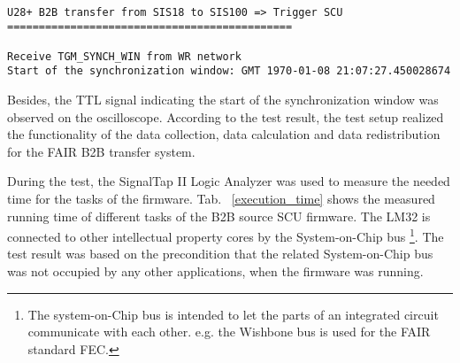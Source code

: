 \begin{lstlisting}[language={[ANSI]C}, keywordstyle=\color{blue!70}, commentstyle=\color{red!50!green!50!blue!50}, frame=shadowbox, rulesepcolor=\color{red!20!green!20!blue!20}]

U28+ B2B transfer from SIS18 to SIS100 => Trigger SCU
=============================================

Receive TGM_SYNCH_WIN from WR network
Start of the synchronization window: GMT 1970-01-08 21:07:27.450028674
\end{lstlisting}

Besides, the TTL signal indicating the start of the synchronization window was observed on the oscilloscope. According to the test result, the test setup realized the functionality of the data collection, data calculation and data redistribution for the FAIR B2B transfer system.


During the test, the SignalTap II Logic Analyzer was used to measure the needed time for the tasks of the firmware. Tab. ~\ref{execution_time} shows the measured running time of different tasks of the B2B source SCU firmware. The LM32 is connected to other intellectual property cores by the System-on-Chip bus \footnote{The system-on-Chip bus is intended to let the parts of an integrated circuit communicate with each other. e.g. the Wishbone bus is used for the FAIR standard FEC.}. The test result was based on the precondition that the related System-on-Chip bus was not occupied by any other applications, when the firmware was running.

